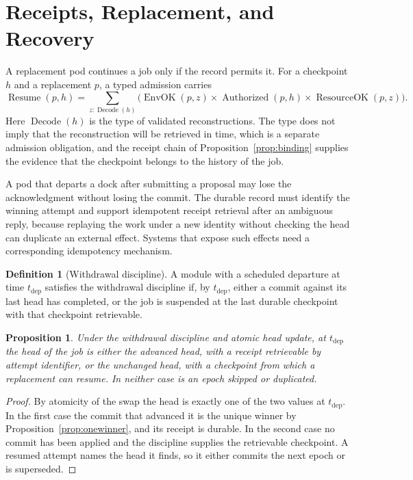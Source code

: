 \documentclass[11pt,openany]{book}
\theoremstyle{plain}
\newtheorem{proposition}[theorem]{Proposition}
\theoremstyle{definition}
\newtheorem{definition}[theorem]{Definition}
\theoremstyle{remark}
\begin{document}
\section{Receipts, Replacement, and Recovery}

A replacement pod continues a job only if the record permits it. For a checkpoint $h$ and a replacement $p$, a typed admission carries
\[
\operatorname{Resume}(p,h)=\sum_{z:\operatorname{Decode}(h)}\bigl(\operatorname{EnvOK}(p,z)\times\operatorname{Authorized}(p,h)\times\operatorname{ResourceOK}(p,z)\bigr).
\]
Here $\operatorname{Decode}(h)$ is the type of validated reconstructions. The type does not imply that the reconstruction will be retrieved in time, which is a separate admission obligation, and the receipt chain of Proposition~\ref{prop:binding} supplies the evidence that the checkpoint belongs to the history of the job.

A pod that departs a dock after submitting a proposal may lose the acknowledgment without losing the commit. The durable record must identify the winning attempt and support idempotent receipt retrieval after an ambiguous reply, because replaying the work under a new identity without checking the head can duplicate an external effect. Systems that expose such effects need a corresponding idempotency mechanism.

\begin{definition}[Withdrawal discipline]
A module with a scheduled departure at time $t_{\mathrm{dep}}$ satisfies the withdrawal discipline if, by $t_{\mathrm{dep}}$, either a commit against its last head has completed, or the job is suspended at the last durable checkpoint with that checkpoint retrievable.
\end{definition}

\begin{proposition}
\label{prop:withdrawal}
Under the withdrawal discipline and atomic head update, at $t_{\mathrm{dep}}$ the head of the job is either the advanced head, with a receipt retrievable by attempt identifier, or the unchanged head, with a checkpoint from which a replacement can resume. In neither case is an epoch skipped or duplicated.
\end{proposition}
\begin{proof}
By atomicity of the swap the head is exactly one of the two values at $t_{\mathrm{dep}}$. In the first case the commit that advanced it is the unique winner by Proposition~\ref{prop:onewinner}, and its receipt is durable. In the second case no commit has been applied and the discipline supplies the retrievable checkpoint. A resumed attempt names the head it finds, so it either commits the next epoch or is superseded.
\end{proof}
\end{document}

